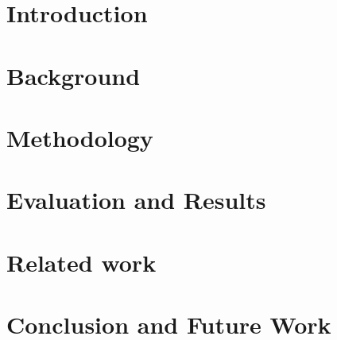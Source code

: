 \chapter{Introduction} \label{Introduction}


\chapter{Background} \label{Background}


\chapter{Methodology} \label{Methodology}


% 

% 

% 

\chapter{Evaluation and Results} \label{Evaluation and Results}


\chapter{Related work} \label{Related work}


\chapter{Conclusion and Future Work} \label{Conclusion and Future Work}



\printbibliography[heading=bibintoc]

% 